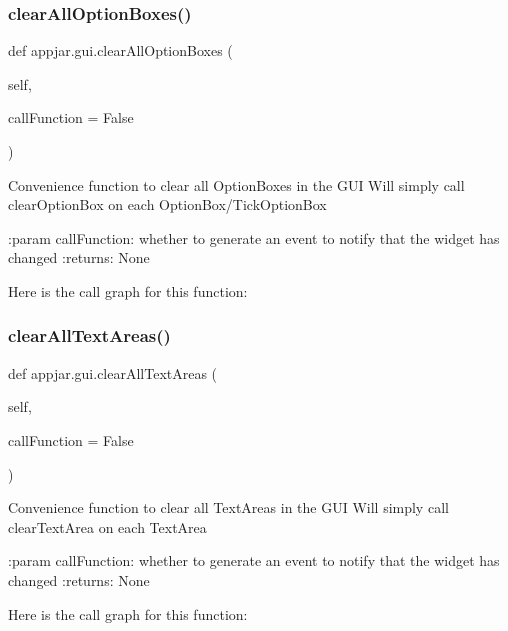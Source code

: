 \subsubsection{\texorpdfstring{clear\+All\+Option\+Boxes()}{clearAllOptionBoxes()}}
{\footnotesize\ttfamily def appjar.\+gui.\+clear\+All\+Option\+Boxes (\begin{DoxyParamCaption}\item[{}]{self,  }\item[{}]{call\+Function = {\ttfamily False} }\end{DoxyParamCaption})}

\begin{DoxyVerb}Convenience function to clear all OptionBoxes in the GUI
Will simply call clearOptionBox on each OptionBox/TickOptionBox

:param callFunction: whether to generate an event to notify that the widget has changed
:returns: None
\end{DoxyVerb}
 Here is the call graph for this function\+:
\mbox{\label{classappjar_1_1gui_accac45b818ccb4073668fc2fe5490ff9}} 
\subsubsection{\texorpdfstring{clear\+All\+Text\+Areas()}{clearAllTextAreas()}}
{\footnotesize\ttfamily def appjar.\+gui.\+clear\+All\+Text\+Areas (\begin{DoxyParamCaption}\item[{}]{self,  }\item[{}]{call\+Function = {\ttfamily False} }\end{DoxyParamCaption})}

\begin{DoxyVerb}Convenience function to clear all TextAreas in the GUI
Will simply call clearTextArea on each TextArea

:param callFunction: whether to generate an event to notify that the widget has changed
:returns: None
\end{DoxyVerb}
 Here is the call graph for this function\+:
\mbox{\label{classappjar_1_1gui_a0db4ea223b08f1db3925b7b42c324de7}} 
